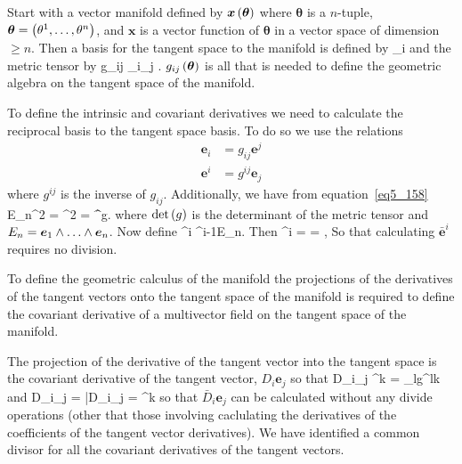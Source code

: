 Start with a vector manifold defined by ${\bm{x}}\left ( {\bm{\theta}} \right )$ where $\bm{\theta}$ is a $n$-tuple,
$\bm{\theta}=\left ( {\theta^{1},\dots,\theta^{n}} \right )$, and $\bm{x}$ is a vector function of $\bm{\theta}$ 
in a vector space of dimension $\ge n$. Then a basis for the tangent space to the manifold is defined by
\be
    _{i} \equiv {}\label{mani_1}
\ee
and the metric tensor by
\be
    g_{ij} \equiv {}_{i}\cdot{}_{j} \label{mani_2}.
\ee
${g_{ij}}\left ( {\bm{\theta}} \right )$ is all that is needed to define the geometric algebra on the tangent space of
the manifold.

To define the intrinsic and covariant derivatives we need to calculate the reciprocal basis to the tangent space basis. To 
do so we use the relations
\begin{align}
    \bm{e}_{i} &= g_{ij}\bm{e}^{j}\label{mani_3}  \\
    \bm{e}^{i} &= g^{ij}\bm{e}_{j}\label{mani_4} 
\end{align}
where $g^{ij}$ is the inverse of $g_{ij}$.  Additionally, we have from
equation~\ref{eq5_158}
\be
    E_{n}^{2} = ^{2} = ^{}\f{\det}{g}\label{mani_5}.
\ee
where ${\det}\left ( {g} \right )$ is the determinant of the metric tensor and $E_{n} = \bm{e}_{1}\W\dots\W\bm{e}_{n}$. Now define
\be
    ^{i} \equiv {}^{i-1}E_{n}\label{mani_6}.
\ee
Then
\be
    ^{i} =  =  \label{mani_7},
\ee
So that calculating $\bm{\bar{e}}^{i}$ requires no division.

To define the geometric calculus of the manifold the projections of the derivatives of the tangent vectors
onto the tangent space of the manifold is required to define the covariant derivative of a multivector
field on the tangent space of the manifold.

The projection of the derivative of the tangent vector into the tangent space is the covariant derivative of the tangent vector,
$D_{i}\bm{e}_{j}$ so that
\be
   D_{i}_{j} \equiv {}^{k} = 
                   _{l}g^{lk}\label{mani_8}
\ee
and
\be\label{mani_9}
    D_{i}_{j} = \bar{D}_{i}_{j} 
                    = ^{k}
\ee
so that $\bar{D}_{i}\bm{e}_{j}$ can be calculated without any divide operations (other that those involving caclulating the derivatives
of the coefficients of the tangent vector derivatives).  We have identified a common divisor for all the covariant derivatives of the
tangent vectors.

